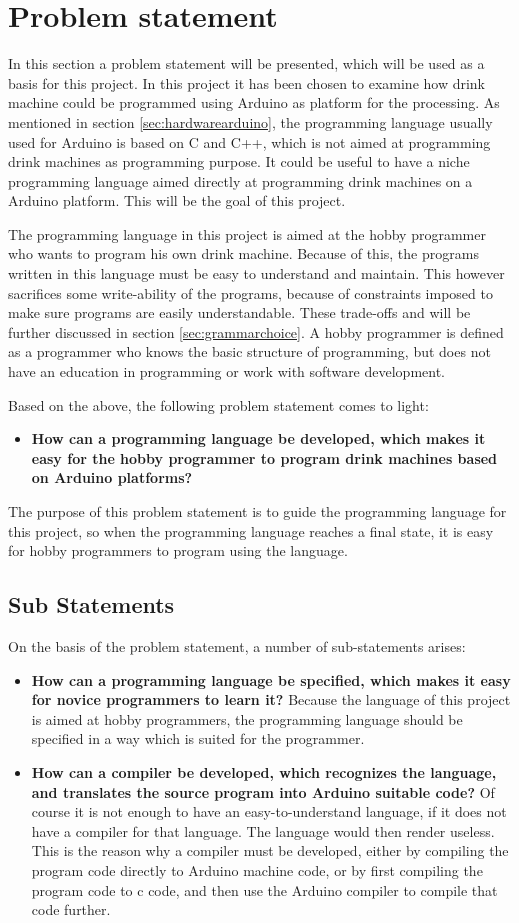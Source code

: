 \section{Problem statement}
In this section a problem statement will be presented, which will be used as a basis for this project. In this project it has been chosen to examine how drink machine could be programmed using Arduino as platform for the processing. As mentioned in section \ref{sec:hardwarearduino}, the programming language usually used for Arduino is based on C and C++, which is not aimed at programming drink machines as programming purpose. It could be useful to have a niche programming language aimed directly at programming drink machines on a Arduino platform. This will be the goal of this project.

The programming language in this project is aimed at the hobby programmer who wants to program his own drink machine. Because of this, the programs written in this language must be easy to understand and maintain. This however sacrifices some write-ability of the programs, because of constraints imposed to make sure programs are easily understandable. These trade-offs and will be further discussed in section \ref{sec:grammarchoice}. A hobby programmer is defined as a programmer who knows the basic structure of programming, but does not have an education in programming or work with software development.

Based on the above, the following problem statement comes to light:
\begin{itemize}
	\item \textbf{How can a programming language be developed, which makes it easy for the hobby programmer to program drink machines based on Arduino platforms?}
\end{itemize}
The purpose of this problem statement is to guide the programming language for this project, so when the programming language reaches a final state, it is easy for hobby programmers to program using the language. 

\subsection{Sub Statements}
On the basis of the problem statement, a number of sub-statements arises:
\begin{itemize}
	\item \textbf{How can a programming language be specified, which makes it easy for novice programmers to learn it?} Because the language of this project is aimed at hobby programmers, the programming language should be specified in a way which is suited for the programmer.
	\item \textbf{How can a compiler be developed, which recognizes the language, and translates the source program into Arduino suitable code?} Of course it is not enough to have an easy-to-understand language, if it does not have a compiler for that language. The language would then render useless. This is the reason why a compiler must be developed, either by compiling the program code directly to Arduino machine code, or by first compiling the program code to c code, and then use the Arduino compiler to compile that code further. 
\end{itemize}